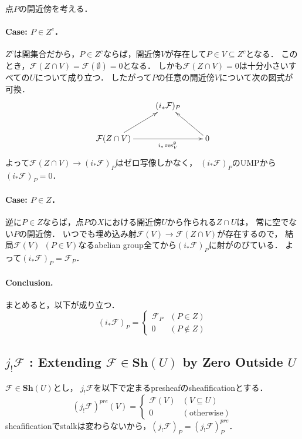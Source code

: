 \documentclass[a4paper]{jsarticle}
\newcommand{\shF}{\mathcal{F}}
\newcommand{\Sh}{\mathbf{Sh}}
\newcommand{\res}{\operatorname{res}}
\begin{document}
    点$P$の開近傍を考える．

    \paragraph{Case: $P \in Z^c$．}
    $Z^c$は開集合だから，$P \in Z^c$ならば，開近傍$V$が存在して$P \in V \subseteq Z^c$となる．
    このとき，$\shF(Z \cap V)=\shF(\emptyset)=0$となる．
    しかも$\shF(Z \cap V)=0$は十分小さいすべての$U$について成り立つ．
    したがって$P$の任意の開近傍$V$について次の図式が可換．
    \[
    \xymatrix
    {
        {} & (i_* \shF)_P & {} \\
        \shF(Z \cap V) \ar[rr]_-{i_* \res_{V}^{\emptyset}} \ar[ur]& {} & 0 \ar[ul]\\
    }
    \]
    よって$\shF(Z \cap V) \to (i_* \shF)_P$はゼロ写像しかなく，
    $(i_* \shF)_P$のUMPから$(i_* \shF)_P=0$．

    \paragraph{Case: $P \in Z$．}
    逆に$P \in Z$ならば，点$P$の$X$における開近傍$U$から作られる$Z \cap U$は，
    常に空でない$P$の開近傍．
    いつでも埋め込み射$\shF(V) \to \shF(Z \cap V)$が存在するので，
    結局$\shF(V) ~~(P \in V)$なるabelian group全てから$(i_* \shF)_P$に射がのびている．
    よって$(i_* \shF)_P=\shF_P$．

    \paragraph{Conclusion.}
    まとめると，以下が成り立つ．
    \[
        (i_* \shF)_P=
        \begin{cases}{}
            \shF_P & (P \in Z) \\
            0 & (P \not \in Z)
        \end{cases}
    \]

    \subsection{$j_! \shF$ : Extending $\shF \in \Sh(U)$ by Zero Outside $U$}
    $\shF \in \Sh(U)$とし，
    $j_! \shF$を以下で定まるpresheafのsheafificationとする．
    \[
        (j_! \shF)^{pre}(V)=
        \begin{cases}{}
            \shF(V) & (V \subseteq U) \\
            0 & (\text{otherwise})
        \end{cases}
    \]
    sheafificationでstalkは変わらないから，$(j_! \shF)_P=(j_! \shF)^{pre}_P$．
\end{document}
